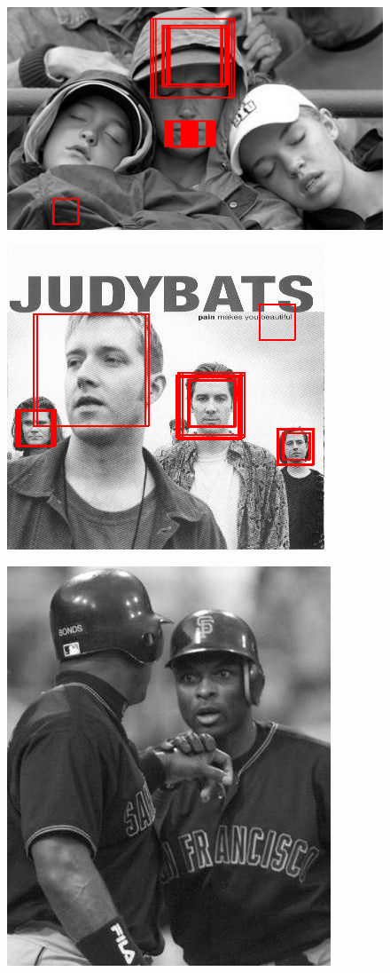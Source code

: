 \documentclass[]{article}
\begin{document}
\begin{figure}[ht]
	\centering
	\includegraphics{fans.png}
	\label{fig:fans}
\end{figure}
\begin{figure}[ht]
	\centering
	\includegraphics{judy.png}
	\label{fig:judy}
\end{figure}
\begin{figure}[ht]
	\centering
	\includegraphics{sports.png}
	\label{fig:sports}
\end{figure}
\end{document}
